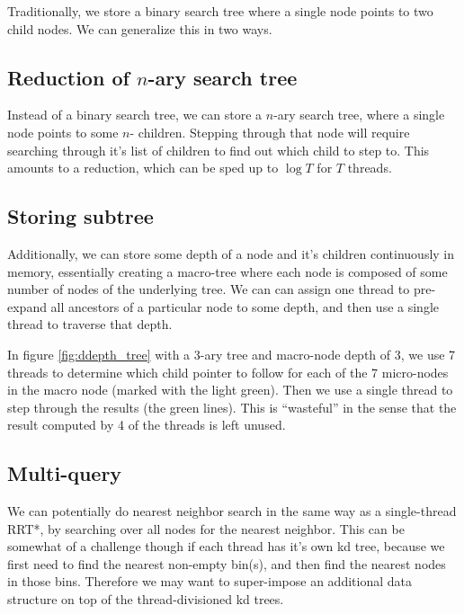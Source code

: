 Traditionally, we store a binary search tree where a single node points to two child nodes. We can generalize this in two ways. 

\subsection{Reduction of $n$-ary search tree}
Instead of a binary search tree, we can store a $n$-ary search tree, where a single node points to some $n$- children. Stepping through that node will require searching through it's list of children to find out which child to step to. This amounts to a reduction, which can be sped up to $\log T$ for $T$ threads. 

\begin{figure}[H]
\begin{centering}
    \texttt{[image: \\figfile\{fig/nary\_search\_tree]}}
    \caption{$n$-ary Search Tree}
    \label{fig:nary_tree}
\end{centering}
\end{figure}

\subsection{Storing subtree}
Additionally, we can store some depth of a node and it's children continuously in memory, essentially creating a macro-tree where each node is composed of some number of nodes of the underlying tree. We can can assign one thread to pre-expand all ancestors of a particular node to some depth, and then use a single thread to traverse that depth.

 \begin{figure}[H]
\begin{centering}
    \texttt{[image: \\figfile\{fig/ddepth\_macro\_tree]}}
    \caption{$d$-depth Search Tree}
    \label{fig:ddepth_tree}
\end{centering}
\end{figure}

In figure \ref{fig:ddepth_tree} with a 3-ary tree and macro-node depth of 3, we use 7 threads to determine which child pointer to follow for each of the 7 micro-nodes in the macro node (marked with the light green). Then we use a single thread to step through the results (the green lines). This is ``wasteful'' in the sense that the result computed by 4 of the threads is left unused. 

\subsection{Multi-query}
We can potentially do nearest neighbor search in the same way as a single-thread RRT*, by searching over all nodes for the nearest neighbor. This can be somewhat of a challenge though if each thread has it's own kd tree, because we first need to find the nearest non-empty bin(s), and then find the nearest nodes in those bins. Therefore we may want to super-impose an additional data structure on top of the thread-divisioned kd trees.  

